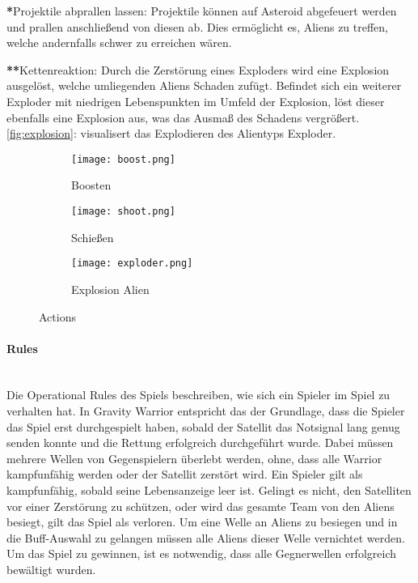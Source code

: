 \documentclass[11pt]{scrartcl}
\newcommand{\lbparagraph}[1]{\paragraph*{#1}\mbox{}\\}
\begin{document}
\textbf{*}Projektile abprallen lassen: Projektile können auf Asteroid abgefeuert werden und prallen anschließend von diesen ab. Dies ermöglicht es, Aliens zu treffen, welche andernfalls schwer zu erreichen wären.

\textbf{**}Kettenreaktion: Durch die Zerstörung eines Exploders wird eine Explosion
ausgelöst, welche umliegenden Aliens Schaden zufügt. Befindet sich ein weiterer Exploder mit niedrigen Lebenspunkten im Umfeld der Explosion, löst dieser ebenfalls eine Explosion aus, was das Ausmaß des Schadens vergrößert. \autoref{fig:explosion}:  visualisert das Explodieren des Alientyps Exploder.  


\begin{figure}[htp]
  \begin{subfigure}[b]{0.32\textwidth}
    \texttt{[image: boost.png]}
    \caption{Boosten}
    \label{fig:boost}
  \end{subfigure}
  \begin{subfigure}[b]{0.32\textwidth}
    \texttt{[image: shoot.png]}
    \caption{Schießen}
    \label{fig:shoot}
  \end{subfigure}
  \begin{subfigure}[b]{0.32\textwidth}
    \texttt{[image: exploder.png]}
    \caption{Explosion Alien}
    \label{fig:explosion}
  \end{subfigure}
  \caption{Actions}
  \label{fig:actions}
\end{figure}


\lbparagraph{Rules}
Die Operational Rules des Spiels beschreiben, wie sich ein Spieler im Spiel zu verhalten hat\cite{K2011}. In Gravity Warrior entspricht das der Grundlage, dass die Spieler das Spiel erst durchgespielt haben, sobald der Satellit das Notsignal lang genug senden konnte und die Rettung erfolgreich durchgeführt wurde. Dabei müssen mehrere Wellen von Gegenspielern überlebt werden, ohne, dass alle Warrior kampfunfähig werden oder der Satellit zerstört wird. Ein Spieler gilt als kampfunfähig, sobald seine Lebensanzeige leer ist. Gelingt es nicht, den Satelliten vor einer Zerstörung zu schützen, oder wird das gesamte Team von den Aliens besiegt, gilt das Spiel als verloren. Um eine Welle an Aliens zu besiegen und in die Buff-Auswahl zu gelangen müssen alle Aliens dieser Welle vernichtet werden. Um das Spiel zu gewinnen, ist es notwendig, dass alle Gegnerwellen erfolgreich bewältigt wurden.
\end{document}
